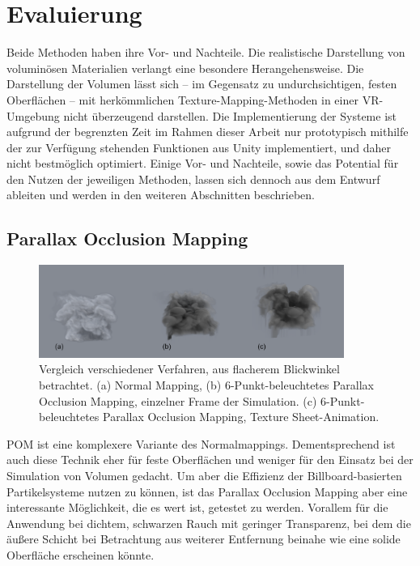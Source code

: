 \section{Evaluierung }
\label{sec:5}

Beide Methoden haben ihre Vor- und Nachteile. Die realistische Darstellung von voluminösen Materialien verlangt
eine besondere Herangehensweise. Die Darstellung der Volumen lässt sich – im Gegensatz zu undurchsichtigen, festen Oberflächen – 
mit herkömmlichen Texture-Mapping-Methoden in einer VR-Umgebung nicht überzeugend darstellen.
Die Implementierung der Systeme ist aufgrund der begrenzten Zeit im Rahmen dieser Arbeit nur prototypisch mithilfe der
zur Verfügung stehenden Funktionen aus Unity implementiert, und daher nicht bestmöglich optimiert.
Einige Vor- und Nachteile, sowie das Potential für den Nutzen der jeweiligen Methoden, lassen sich dennoch aus dem Entwurf
ableiten und werden in den weiteren Abschnitten beschrieben.


\subsection{Parallax Occlusion Mapping}
\label{sec:5.1}
\begin{figure}[!h]
	\centering
	\includegraphics[width=0.89\textwidth]{Grafiken/Implementation/pom_Vergleich.png}
	\begin{footnotesize}
		\caption{Vergleich verschiedener Verfahren, aus flacherem Blickwinkel betrachtet. 
		(a) Normal Mapping, (b) 6-Punkt-beleuchtetes Parallax Occlusion Mapping, einzelner Frame der Simulation. (c) 6-Punkt-beleuchtetes Parallax Occlusion Mapping, Texture Sheet-Animation. }
		\label{fig:pomVergleich}
	\end{footnotesize}
\end{figure}

POM ist eine komplexere Variante des Normalmappings. Dementsprechend ist auch diese Technik eher für feste Oberflächen und weniger
für den Einsatz bei der Simulation von Volumen gedacht. Um aber die Effizienz der Billboard-basierten Partikelsysteme
nutzen zu können, ist das Parallax Occlusion Mapping aber eine interessante Möglichkeit, die es wert ist, getestet zu werden. 
Vorallem für die Anwendung bei dichtem, schwarzen Rauch mit geringer Transparenz, bei dem die äußere Schicht bei Betrachtung aus weiterer 
Entfernung beinahe wie eine solide Oberfläche erscheinen könnte. 

